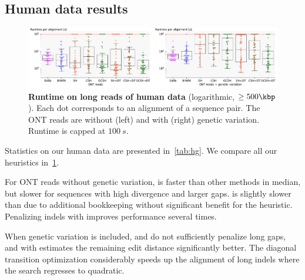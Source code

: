 \subsection{Human data results}\label{app:human}



\begin{figure}[t]
  \centering
  \includegraphics[scale=0.55]{plots/real_full.pdf}%
  \caption[Runtime on long reads of human data]{\textbf{Runtime on long reads of
    human data} (logarithmic, $\geq 500\kbp$). Each dot corresponds to an
    alignment of a sequence pair. The ONT reads are without (left) and with
    (right) genetic variation. Runtime is capped at $\qty{100}{s}$.}
  \label{fig:human-full}
\end{figure}

Statistics on our human data are presented in~\cref{tab:hg}. We compare all our
heuristics in~\cref{fig:human-full}.

For ONT reads without genetic variation, \SH is faster than other methods in
median, but slower for sequences with high divergence and larger gaps.
\CSH is slightly slower than \SH due to additional bookkeeping without
significant benefit for the heuristic. Penalizing indels with \GCH improves
performance several times.

When genetic variation is included, \SH and \CSH do not sufficiently penalize
long gaps, and \A with \GCH estimates the remaining edit distance significantly
better. The diagonal transition optimization considerably speeds up the
alignment of long indels where the search regresses to quadratic.

